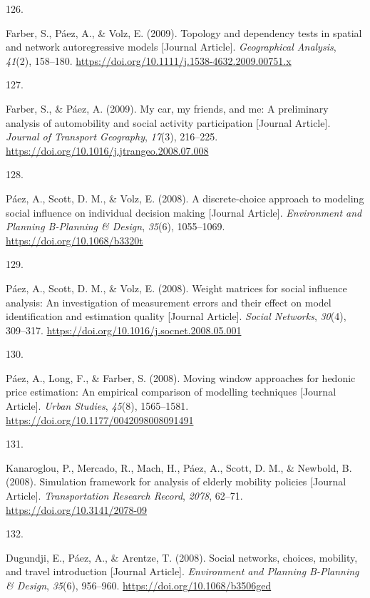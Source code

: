 \documentclass[11pt,a4paper,]{awesome-cv}
\newlength{\cslhangindent}
\newlength{\csllabelwidth}
\newenvironment{CSLReferences}[2] %
 {\begin{list}{}{%
  \setlength{\itemindent}{0pt}
  \setlength{\leftmargin}{0pt}
  \setlength{\parsep}{0pt}
  \ifodd #1
   \setlength{\leftmargin}{\cslhangindent}
   \setlength{\itemindent}{-1\cslhangindent}
  \fi
  \setlength{\itemsep}{#2\baselineskip}}}
 {\end{list}}
\newcommand{\CSLLeftMargin}[1]{\parbox[t]{\csllabelwidth}{\strut#1\strut}}
\newcommand{\CSLRightInline}[1]{\parbox[t]{\linewidth - \csllabelwidth}{\strut#1\strut}}
\begin{document}
\begin{CSLReferences}{0}{0}
\CSLLeftMargin{126. }%
\CSLRightInline{Farber, S., Páez, A., \& Volz, E. (2009). Topology and
dependency tests in spatial and network autoregressive models {[}Journal
Article{]}. \emph{Geographical Analysis}, \emph{41}(2), 158--180.
\url{https://doi.org/10.1111/j.1538-4632.2009.00751.x}}

\CSLLeftMargin{127. }%
\CSLRightInline{Farber, S., \& Páez, A. (2009). My car, my friends, and
me: A preliminary analysis of automobility and social activity
participation {[}Journal Article{]}. \emph{Journal of Transport
Geography}, \emph{17}(3), 216--225.
\url{https://doi.org/10.1016/j.jtrangeo.2008.07.008}}

\CSLLeftMargin{128. }%
\CSLRightInline{Páez, A., Scott, D. M., \& Volz, E. (2008). A
discrete-choice approach to modeling social influence on individual
decision making {[}Journal Article{]}. \emph{Environment and Planning
B-Planning \& Design}, \emph{35}(6), 1055--1069.
\url{https://doi.org/10.1068/b3320t}}

\CSLLeftMargin{129. }%
\CSLRightInline{Páez, A., Scott, D. M., \& Volz, E. (2008). Weight
matrices for social influence analysis: An investigation of measurement
errors and their effect on model identification and estimation quality
{[}Journal Article{]}. \emph{Social Networks}, \emph{30}(4), 309--317.
\url{https://doi.org/10.1016/j.socnet.2008.05.001}}

\CSLLeftMargin{130. }%
\CSLRightInline{Páez, A., Long, F., \& Farber, S. (2008). Moving window
approaches for hedonic price estimation: An empirical comparison of
modelling techniques {[}Journal Article{]}. \emph{Urban Studies},
\emph{45}(8), 1565--1581.
\url{https://doi.org/10.1177/0042098008091491}}

\CSLLeftMargin{131. }%
\CSLRightInline{Kanaroglou, P., Mercado, R., Mach, H., Páez, A., Scott,
D. M., \& Newbold, B. (2008). Simulation framework for analysis of
elderly mobility policies {[}Journal Article{]}. \emph{Transportation
Research Record}, \emph{2078}, 62--71.
\url{https://doi.org/10.3141/2078-09}}

\CSLLeftMargin{132. }%
\CSLRightInline{Dugundji, E., Páez, A., \& Arentze, T. (2008). Social
networks, choices, mobility, and travel introduction {[}Journal
Article{]}. \emph{Environment and Planning B-Planning \& Design},
\emph{35}(6), 956--960. \url{https://doi.org/10.1068/b3506ged}}


\end{CSLReferences}
\end{document}

